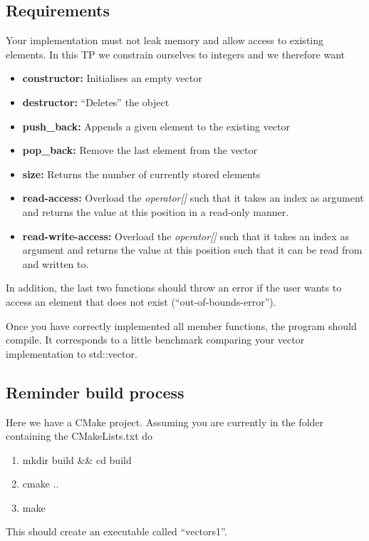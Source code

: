 \documentclass[onecolumn,11pt,oneside]{article}
\begin{document}
\subsection{Requirements}
    Your implementation must not leak memory and allow access to existing
    elements.
    In this TP we constrain ourselves to integers and we therefore want
    \begin{itemize}
        \item \textbf{constructor:} Initialises an empty vector
        \item \textbf{destructor:} ``Deletes'' the object
        \item \textbf{push\_back:} Appends a given element to the existing vector
        \item \textbf{pop\_back:} Remove the last element from the vector
        \item \textbf{size:} Returns the number of currently stored elements
        \item \textbf{read-access:} Overload the \textit{operator[]} such that it
              takes an index as argument and returns the value at this
              position in a read-only manner.
        \item \textbf{read-write-access:} Overload the \textit{operator[]} such that it
              takes an index as argument and returns the value at this
              position such that it can be read from and written to.
    \end{itemize}
    In addition, the last two functions should throw an error if the user
    wants to access an element that does not exist (``out-of-bounds-error'').

    Once you have correctly implemented all member functions, the program should compile.
    It corresponds to a little benchmark comparing your vector implementation to std::vector.

\subsection*{Reminder build process}
    Here we have a CMake project.
    Assuming you are currently in the folder containing the CMakeLists.txt do
    \begin{enumerate}
        \item mkdir build \&\& cd build
        \item cmake ..
        \item make
    \end{enumerate}

    This should create an executable called ``vectors1''.
\end{document}
